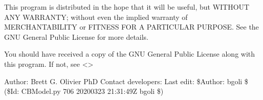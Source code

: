 \documentclass[letterpaper,12pt,english]{sphinxmanual}
\begin{document}
\sphinxAtStartPar
This program is distributed in the hope that it will be useful,
but WITHOUT ANY WARRANTY; without even the implied warranty of
MERCHANTABILITY or FITNESS FOR A PARTICULAR PURPOSE.  See the
GNU General Public License for more details.

\sphinxAtStartPar
You should have received a copy of the GNU General Public License
along with this program.  If not, see \textless{}\textgreater{}

\sphinxAtStartPar
Author: Brett G. Olivier PhD
Contact developers: 
Last edit: \$Author: bgoli \$ (\$Id: CBModel.py 706 2020\sphinxhyphen{}03\sphinxhyphen{}23 21:31:49Z bgoli \$)
\end{document}
